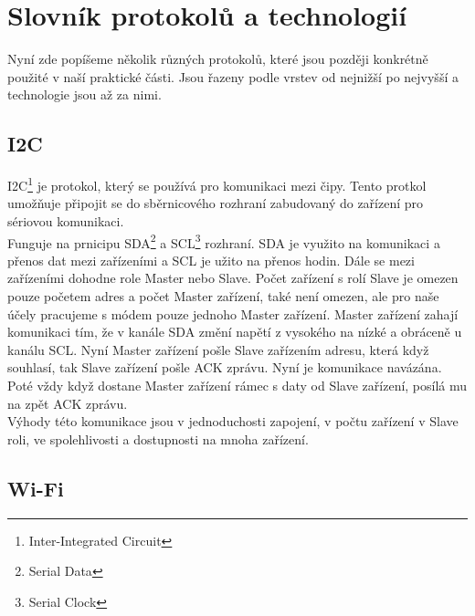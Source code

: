 \documentclass[12pt]{report}			%
\begin{document}
			\section{Slovník protokolů a technologií}
Nyní zde popíšeme několik různých protokolů, které jsou později konkrétně použité v naší praktické části. Jsou řazeny podle vrstev od nejnižší po nejvyšší a technologie jsou až za nimi.
				\subsection{I2C}
I2C\footnote{Inter-Integrated Circuit} je protokol, který se používá pro komunikaci mezi čipy. Tento protkol umožňuje připojit se do sběrnicového rozhraní zabudovaný do zařízení pro sériovou komunikaci. 
\\
Funguje na prnicipu SDA\footnote{Serial Data} a SCL\footnote{Serial Clock} rozhraní. SDA je využito na komunikaci a přenos dat mezi zařízeními a SCL je užito na přenos hodin. Dále se mezi zařízeními dohodne role Master nebo Slave. Počet zařízení s rolí Slave je omezen pouze početem adres a počet Master zařízení, také není omezen, ale pro naše účely pracujeme s módem pouze jednoho Master zařízení. Master zařízení zahají komunikaci tím, že v kanále SDA změní napětí z vysokého na nízké a obráceně u kanálu SCL. Nyní Master zařízení pošle Slave zařízením adresu, která když souhlasí, tak Slave zařízení pošle ACK zprávu. Nyní je komunikace navázána. Poté vždy když dostane Master zařízení rámec s daty od Slave zařízení, posílá mu na zpět ACK zprávu.
\\
Výhody této komunikace jsou v jednoduchosti zapojení, v počtu zařízení v Slave roli, ve spolehlivosti a dostupnosti na mnoha zařízení.  


\cite{i2c1}
\cite{i2c2}
\cite{i2c3}
\cite{i2c4}
				\subsection{Wi-Fi}
\end{document}
